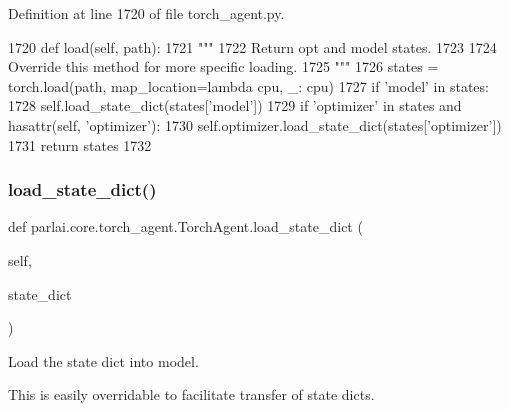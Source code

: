 Definition at line 1720 of file torch\+\_\+agent.\+py.


\begin{DoxyCode}
1720     \textcolor{keyword}{def }load(self, path):
1721         \textcolor{stringliteral}{"""}
1722 \textcolor{stringliteral}{        Return opt and model states.}
1723 \textcolor{stringliteral}{}
1724 \textcolor{stringliteral}{        Override this method for more specific loading.}
1725 \textcolor{stringliteral}{        """}
1726         states = torch.load(path, map\_location=\textcolor{keyword}{lambda} cpu, \_: cpu)
1727         \textcolor{keywordflow}{if} \textcolor{stringliteral}{'model'} \textcolor{keywordflow}{in} states:
1728             self.load\_state\_dict(states[\textcolor{stringliteral}{'model'}])
1729         \textcolor{keywordflow}{if} \textcolor{stringliteral}{'optimizer'} \textcolor{keywordflow}{in} states \textcolor{keywordflow}{and} hasattr(self, \textcolor{stringliteral}{'optimizer'}):
1730             self.optimizer.load\_state\_dict(states[\textcolor{stringliteral}{'optimizer'}])
1731         \textcolor{keywordflow}{return} states
1732 
\end{DoxyCode}
\mbox{\label{classparlai_1_1core_1_1torch__agent_1_1TorchAgent_a5dcfca62a677f8de97f09ce993258f84}} 
\subsubsection{\texorpdfstring{load\+\_\+state\+\_\+dict()}{load\_state\_dict()}}
{\footnotesize\ttfamily def parlai.\+core.\+torch\+\_\+agent.\+Torch\+Agent.\+load\+\_\+state\+\_\+dict (\begin{DoxyParamCaption}\item[{}]{self,  }\item[{}]{state\+\_\+dict }\end{DoxyParamCaption})}

\begin{DoxyVerb}Load the state dict into model.

This is easily overridable to facilitate transfer of state dicts.
\end{DoxyVerb}
 

